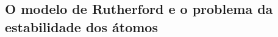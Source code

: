 \subsection{O modelo de Rutherford e o problema da estabilidade dos átomos}
\label{ssec:rutherford_model}